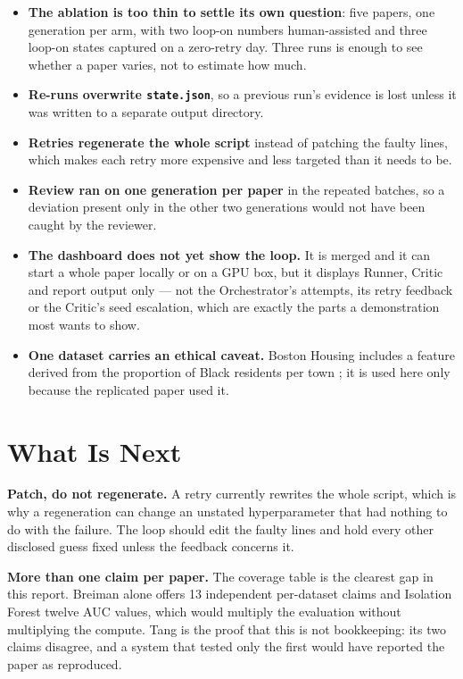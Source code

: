\documentclass[11pt]{article}
\begin{document}
\begin{itemize}
  \item \textbf{The ablation is too thin to settle its own question}: five papers, one generation
    per arm, with two loop-on numbers human-assisted and three loop-on states captured on a
    zero-retry day. Three runs is enough to see whether a paper varies, not to estimate how much.
  \item \textbf{Re-runs overwrite \texttt{state.json}}, so a previous run's evidence is lost
    unless it was written to a separate output directory.
  \item \textbf{Retries regenerate the whole script} instead of patching the faulty lines, which
    makes each retry more expensive and less targeted than it needs to be.
  \item \textbf{Review ran on one generation per paper} in the repeated batches, so a deviation
    present only in the other two generations would not have been caught by the reviewer.
  \item \textbf{The dashboard does not yet show the loop.} It is merged and it can start a whole
    paper locally or on a GPU box, but it displays Runner, Critic and report output only --- not
    the Orchestrator's attempts, its retry feedback or the Critic's seed escalation, which are
    exactly the parts a demonstration most wants to show.
  \item \textbf{One dataset carries an ethical caveat.} Boston Housing includes a feature derived
    from the proportion of Black residents per town \cite{harrison1978hedonic}; it is used here
    only because the replicated paper used it.
\end{itemize}

\section{What Is Next}
\label{sec:future}

\textbf{Patch, do not regenerate.} A retry currently rewrites the whole script, which is why a
regeneration can change an unstated hyperparameter that had nothing to do with the failure. The
loop should edit the faulty lines and hold every other disclosed guess fixed unless the feedback
concerns it.

\textbf{More than one claim per paper.} The coverage table is the clearest gap in this report.
Breiman alone offers 13 independent per-dataset claims and Isolation Forest twelve AUC values,
which would multiply the evaluation without multiplying the compute. Tang is the proof that this
is not bookkeeping: its two claims disagree, and a system that tested only the first would have
reported the paper as reproduced.
\end{document}
